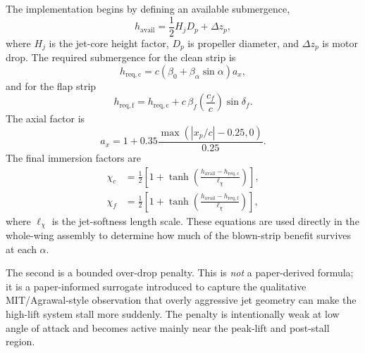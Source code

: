 \documentclass[conf]{new-aiaa}
\begin{document}
The implementation begins by defining an available submergence,
\begin{equation}
h_{\mathrm{avail}} = \frac{1}{2}H_j D_p + \Delta z_p,
\end{equation}
where \(H_j\) is the jet-core height factor, \(D_p\) is propeller diameter, and \(\Delta z_p\) is motor drop. The required submergence for the clean strip is
\begin{equation}
h_{\mathrm{req,c}} =
c\left(\beta_0 + \beta_\alpha \sin\alpha\right)a_x,
\end{equation}
and for the flap strip
\begin{equation}
h_{\mathrm{req,f}} =
h_{\mathrm{req,c}} +
c\,\beta_f \left(\frac{c_f}{c}\right)\sin\delta_f.
\end{equation}
The axial factor is
\begin{equation}
a_x = 1 + 0.35\frac{\max(|x_p/c|-0.25,0)}{0.25}.
\end{equation}
The final immersion factors are
\begin{align}
\chi_c &= \frac{1}{2}\left[1+\tanh\left(\frac{h_{\mathrm{avail}}-h_{\mathrm{req,c}}}{\ell_\chi}\right)\right], \\
\chi_f &= \frac{1}{2}\left[1+\tanh\left(\frac{h_{\mathrm{avail}}-h_{\mathrm{req,f}}}{\ell_\chi}\right)\right],
\end{align}
where \(\ell_\chi\) is the jet-softness length scale. These equations are used directly in the whole-wing assembly to determine how much of the blown-strip benefit survives at each \(\alpha\).

The second is a bounded over-drop penalty. This is \emph{not} a paper-derived formula; it is a paper-informed surrogate introduced to capture the qualitative MIT/Agrawal-style observation that overly aggressive jet geometry can make the high-lift system stall more suddenly.\cite{Agrawal2019} The penalty is intentionally weak at low angle of attack and becomes active mainly near the peak-lift and post-stall region.
\end{document}
